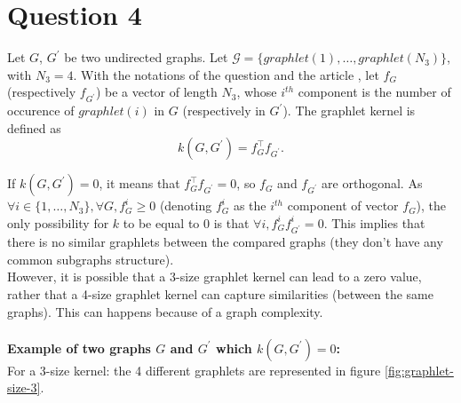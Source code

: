 \documentclass[a4paper]{article}
\begin{document}
\section*{Question 4}
Let $G$, $ G^{'}$ be two undirected graphs. Let $\mathcal{G} = \{graphlet(1), \dots, graphlet(N_3)\}$,
with $N_3 = 4$. With the notations of the question and the article \cite{pmlr-v5-shervashidze09a},
let $f_G$ (respectively $f_{G^{'}}$) be a vector of length $N_3$, whose $i^{th}$
component is the number of occurence of $graphlet(i)$ in $G$ (respectively in $G^{'}$).
The graphlet kernel is defined as $$k(G, G^{'}) = f_G^\top f_{G^{'}}.$$

If $k(G, G^{'}) = 0$, it means that $f_G^\top f_{G^{'}} = 0$, so $f_G$ and $f_{G^{'}}$
are orthogonal. As $\forall i \in \{1, \dots, N_3\}, \forall G,  f_G^i \geq 0$ (denoting $f_G^i$ as the $i^{th}$
component of vector $f_G$), the only possibility for $k$ to be equal to $0$ is
that $\forall i, f_G^i f_{G^{'}}^i = 0$. This implies that there is no similar graphlets
between the compared graphs (they don't have any common subgraphs structure).
\\
However, it is possible that a 3-size graphlet kernel can lead to a zero value,
rather that a 4-size graphlet kernel can capture similarities (between the same graphs).
This can happens because of a graph complexity.
\\
\\
\textbf{Example of two graphs $G$ and $G^{'}$ which $k(G, G^{'})=0$:}
\\
For a 3-size kernel: the 4 different graphlets are represented in figure \ref{fig:graphlet-size-3}.
\end{document}
